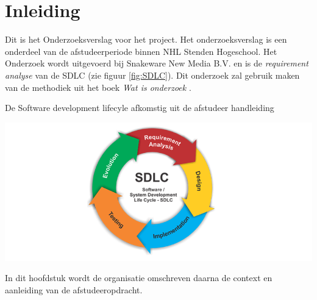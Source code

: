 \chapter{Inleiding}
Dit is het Onderzoeksverslag voor het  project.
Het onderzoeksverslag is een onderdeel van de afstudeerperiode binnen NHL Stenden Hogeschool.
Het Onderzoek wordt uitgevoerd bij Snakeware New Media B.V. en is de \textit{requirement analyse} van de \gls{SDLC} (zie figuur \ref{fig:SDLC}).
Dit onderzoek zal gebruik maken van de methodiek uit het boek \textit{Wat is onderzoek} \Parencite{Verhoeven}.

\whitespace
\begin{graphic}
    \vspace{0.2cm}
    \captionsetup{type=figure}
    \caption{De Software development lifecyle afkomstig uit de afstudeer handleiding \Parencite{Afstudeerhandleiding}}
    \includegraphics[scale=0.5]{img/SDLC.png}
    \label{fig:SDLC}
    \vspace{0.2cm}
\end{graphic}
In dit hoofdstuk wordt de organisatie omschreven daarna de context en aanleiding van de afstudeeropdracht.



% 

